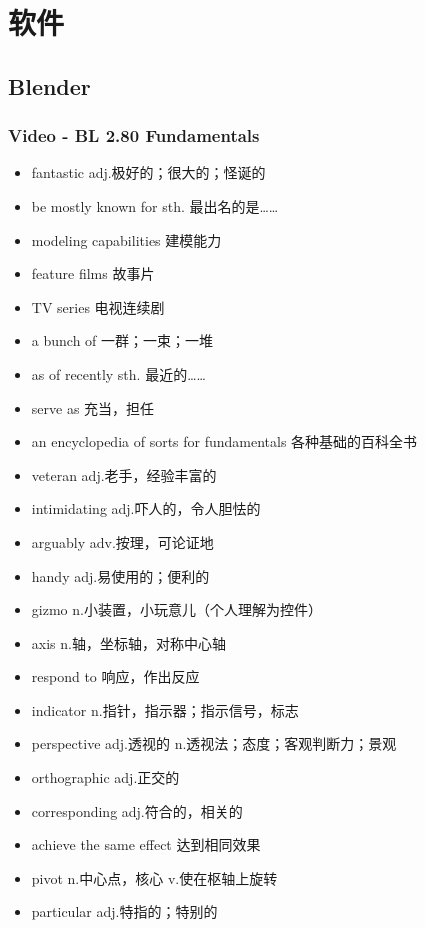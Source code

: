 \chapter{软件}
\section{Blender}
\subsection{Video - BL 2.80 Fundamentals}
\begin{multicols}{2}
    \begin{itemize}
        \item fantastic adj.极好的；很大的；怪诞的
        \item be mostly known for sth. 最出名的是……
        \item modeling capabilities 建模能力
        \item feature films 故事片
        \item TV series 电视连续剧
        \item a bunch of 一群；一束；一堆
        \item as of recently sth. 最近的……
        \item serve as 充当，担任
        \item an encyclopedia of sorts for fundamentals 各种基础的百科全书
        \item veteran adj.老手，经验丰富的
        \item intimidating adj.吓人的，令人胆怯的
        \item arguably adv.按理，可论证地
        \item handy adj.易使用的；便利的
        \item gizmo n.小装置，小玩意儿（个人理解为控件）
        \item axis n.轴，坐标轴，对称中心轴
        \item respond to 响应，作出反应
        \item indicator n.指针，指示器；指示信号，标志
        \item perspective adj.透视的 n.透视法；态度；客观判断力；景观
        \item orthographic adj.正交的
        \item corresponding adj.符合的，相关的
        \item achieve the same effect 达到相同效果
        \item pivot n.中心点，核心 v.使在枢轴上旋转
        \item particular adj.特指的；特别的

\end{itemize}
\end{multicols}

